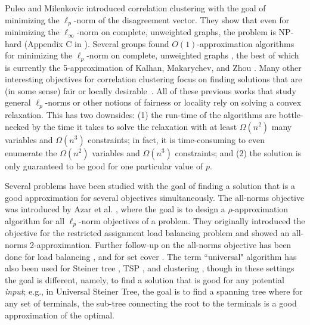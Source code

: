 Puleo and Milenkovic \citeyearpar{PM16} introduced correlation clustering
with the goal of minimizing the $\ell_p$-norm of the disagreement vector.
They show that even for minimizing the $\ell_\infty$-norm on complete, unweighted graphs, the problem is \textsf{NP}-hard (Appendix C in \cite{PM16}).
Several groups found $O(1)$-approximation algorithms for minimizing the $\ell_p$-norm on complete, unweighted graphs \cite{PM16, CGS17, KMZ19}, the best of which is currently the 5-approximation of Kalhan, Makarychev, and Zhou \citeyearpar{KMZ19}.
Many other interesting objectives for correlation clustering focus on finding solutions that are (in some sense) fair or locally desirable~\cite{ahmadian2020fair, bateni2022scalable, ahmadi2020fair, friggstad2021fair, jafarov2021local, Khuller2019min}.
All of these previous works that study general $\ell_p$-norms or other notions of fairness or locality rely on solving a convex relaxation. 
This has two downsides: (1) the run-time of the algorithms are bottle-necked by the time it takes to solve the relaxation with at least $\Omega(n^2)$ many variables and $\Omega(n^3)$ constraints; in fact, it is time-consuming to even enumerate the $\Omega(n^2)$ variables and $\Omega(n^3)$ constraints; and (2) the solution is only guaranteed to be good for one particular value of $p$. 

 Several problems have been studied with the goal of finding a solution 
that is a good approximation for several objectives simultaneously.
The all-norms objective was introduced by Azar et al. \cite{azar2004all}, where the goal is to design a $\rho$-approximation algorithm for all $\ell_p$-norm objectives of a problem. 
They originally introduced the objective for the restricted assignment load balancing problem 
and showed an all-norms 2-approximation.
Further follow-up on the all-norms objective has been done for load balancing \cite{kleinberg1999fairness, bernstein2017simultaneously, langley2020improved}, and for set cover \cite{golovin2008all}.
The term ``universal" algorithm has also been used for Steiner tree \cite{busch2012split, busch2023one}, TSP \cite{jia2005universal}, and clustering \cite{ganesh2023universal}, 
though in these settings the goal is different, namely, to find a solution that is good for any potential \textit{input}; e.g., in Universal Steiner Tree, the goal is to find a spanning tree where for any set of terminals, the sub-tree connecting the root to the terminals is a good approximation of the optimal.

